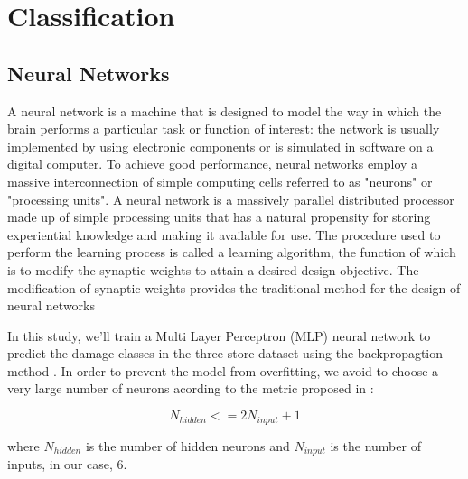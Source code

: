 \documentclass[twocolumn]{article}
\begin{document}

\section{Classification}



\subsection{Neural Networks}

A neural network is a machine that is designed to model the way in which the brain performs a particular task or function of interest: the network is usually implemented by using electronic components or is simulated in software on a digital computer. To achieve good performance, neural networks employ a massive interconnection of simple computing cells referred to as "neurons" or "processing units". A neural network is a massively parallel distributed processor made up of simple processing units that has a natural propensity for storing experiential knowledge and making it available for use. The procedure used to perform the learning process is called a learning algorithm, the function of which is to modify the synaptic weights to attain a desired design objective. The modification of synaptic weights provides the traditional method for the design of neural networks \cite{haykin2}

In this study, we'll train a Multi Layer Perceptron (MLP) neural network to predict the damage classes in the three store dataset using the backpropagtion method \cite{haykin2}. In order to prevent the model from overfitting, we avoid to choose a very large number of neurons acording to the metric proposed in \cite{HECHTNIELSEN199265}:

\[N_{hidden} <= 2N_{input} + 1\]

where $N_{hidden}$ is the number of hidden neurons and $N_{input}$ is the number of inputs, in our case, 6.
\end{document}
